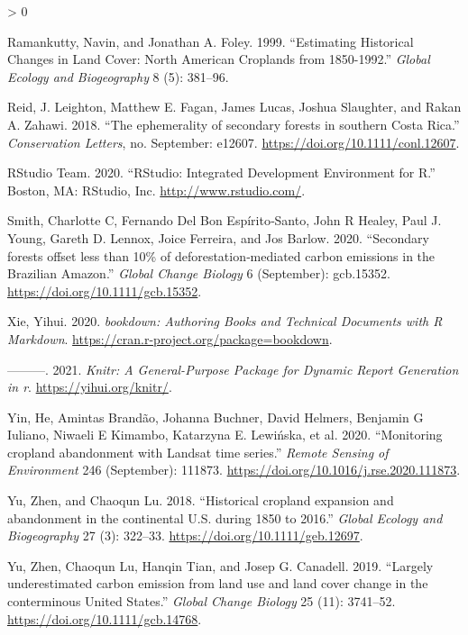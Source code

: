 \documentclass[
]{article}
\newlength{\cslhangindent}
\newenvironment{CSLReferences}[2] %
 {%
  \setlength{\parindent}{0pt}
  \ifodd #1 \everypar{\setlength{\hangindent}{\cslhangindent}}\ignorespaces\fi
  \ifnum #2 > 0
  \setlength{\parskip}{#2\baselineskip}
  \fi
 }%
 {}
\begin{document}
\begin{CSLReferences}{1}{0}
\leavevmode\hypertarget{ref-Ramankutty1999}{}%
Ramankutty, Navin, and Jonathan A. Foley. 1999. {``{Estimating Historical Changes in Land Cover: North American Croplands from 1850-1992}.''} \emph{Global Ecology and Biogeography} 8 (5): 381--96.

\leavevmode\hypertarget{ref-Reid2018}{}%
Reid, J. Leighton, Matthew E. Fagan, James Lucas, Joshua Slaughter, and Rakan A. Zahawi. 2018. {``{The ephemerality of secondary forests in southern Costa Rica}.''} \emph{Conservation Letters}, no. September: e12607. \url{https://doi.org/10.1111/conl.12607}.

\leavevmode\hypertarget{ref-RStudioTeam2020}{}%
RStudio Team. 2020. {``{RStudio: Integrated Development Environment for R}.''} Boston, MA: RStudio, Inc. \url{http://www.rstudio.com/}.

\leavevmode\hypertarget{ref-Smith2020}{}%
Smith, Charlotte C, Fernando Del Bon Espírito‐Santo, John R Healey, Paul J. Young, Gareth D. Lennox, Joice Ferreira, and Jos Barlow. 2020. {``{Secondary forests offset less than 10{\%} of deforestation‐mediated carbon emissions in the Brazilian Amazon}.''} \emph{Global Change Biology} 6 (September): gcb.15352. \url{https://doi.org/10.1111/gcb.15352}.

\leavevmode\hypertarget{ref-R-bookdown}{}%
Xie, Yihui. 2020. \emph{{bookdown: Authoring Books and Technical Documents with R Markdown}}. \url{https://cran.r-project.org/package=bookdown}.

\leavevmode\hypertarget{ref-R-knitr}{}%
---------. 2021. \emph{Knitr: A General-Purpose Package for Dynamic Report Generation in r}. \url{https://yihui.org/knitr/}.

\leavevmode\hypertarget{ref-Yin2020}{}%
Yin, He, Amintas Brandão, Johanna Buchner, David Helmers, Benjamin G Iuliano, Niwaeli E Kimambo, Katarzyna E. Lewińska, et al. 2020. {``{Monitoring cropland abandonment with Landsat time series}.''} \emph{Remote Sensing of Environment} 246 (September): 111873. \url{https://doi.org/10.1016/j.rse.2020.111873}.

\leavevmode\hypertarget{ref-Yu2018}{}%
Yu, Zhen, and Chaoqun Lu. 2018. {``{Historical cropland expansion and abandonment in the continental U.S. during 1850 to 2016}.''} \emph{Global Ecology and Biogeography} 27 (3): 322--33. \url{https://doi.org/10.1111/geb.12697}.

\leavevmode\hypertarget{ref-Yu2019}{}%
Yu, Zhen, Chaoqun Lu, Hanqin Tian, and Josep G. Canadell. 2019. {``{Largely underestimated carbon emission from land use and land cover change in the conterminous United States}.''} \emph{Global Change Biology} 25 (11): 3741--52. \url{https://doi.org/10.1111/gcb.14768}.

\end{CSLReferences}
\end{document}
